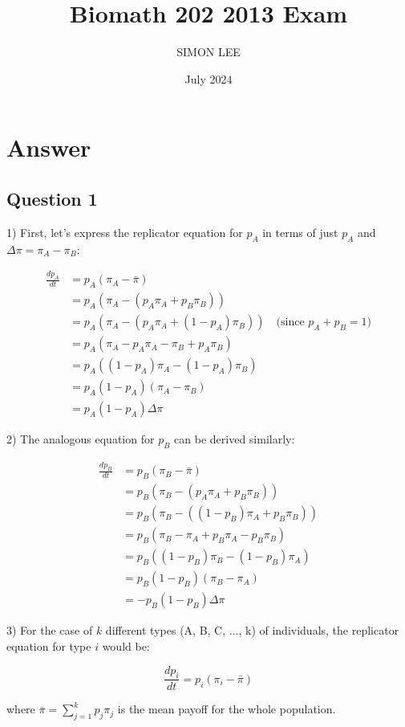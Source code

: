\documentclass{article}
\title{Biomath 202 2013 Exam}
\author{SIMON LEE}
\date{July 2024}
\begin{document}
\maketitle

\section{Answer}

\subsection{Question 1}

1) First, let's express the replicator equation for $p_A$ in terms of just $p_A$ and $\Delta\pi = \pi_A - \pi_B$:

\begin{align*}
\frac{dp_A}{dt} &= p_A(\pi_A - \bar{\pi}) \\
&= p_A(\pi_A - (p_A\pi_A + p_B\pi_B)) \\
&= p_A(\pi_A - (p_A\pi_A + (1-p_A)\pi_B)) \quad \text{(since $p_A + p_B = 1$)} \\
&= p_A(\pi_A - p_A\pi_A - \pi_B + p_A\pi_B) \\
&= p_A((1-p_A)\pi_A - (1-p_A)\pi_B) \\
&= p_A(1-p_A)(\pi_A - \pi_B) \\
&= p_A(1-p_A)\Delta\pi
\end{align*}

2) The analogous equation for $p_B$ can be derived similarly:

\begin{align*}
\frac{dp_B}{dt} &= p_B(\pi_B - \bar{\pi}) \\
&= p_B(\pi_B - (p_A\pi_A + p_B\pi_B)) \\
&= p_B(\pi_B - ((1-p_B)\pi_A + p_B\pi_B)) \\
&= p_B(\pi_B - \pi_A + p_B\pi_A - p_B\pi_B) \\
&= p_B((1-p_B)\pi_B - (1-p_B)\pi_A) \\
&= p_B(1-p_B)(\pi_B - \pi_A) \\
&= -p_B(1-p_B)\Delta\pi
\end{align*}

3) For the case of $k$ different types (A, B, C, ..., k) of individuals, the replicator equation for type $i$ would be:

\[ \frac{dp_i}{dt} = p_i(\pi_i - \bar{\pi}) \]

where $\bar{\pi} = \sum_{j=1}^k p_j\pi_j$ is the mean payoff for the whole population.
\end{document}
